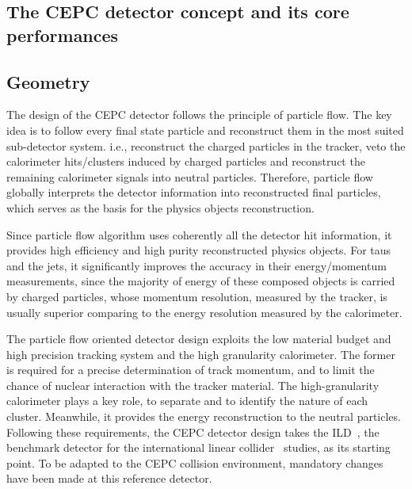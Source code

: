 \documentclass[a4paper,10pt,twoside]{cpc-hepnp}
\begin{document}
\begin{multicols}{2}
\section{The CEPC detector concept\label{sec:detector} and its core performances}

\subsection{Geometry}

The design of the CEPC detector follows the principle of particle flow. 
The key idea is to follow every final state particle and reconstruct them in the most suited sub-detector system. 
i.e., reconstruct the charged particles in the tracker, veto the calorimeter hits/clusters induced by charged particles and reconstruct the remaining calorimeter signals into neutral particles. 
Therefore, particle flow globally interprets the detector information into reconstructed final particles, which serves as the basis for the physics objects reconstruction. 

Since particle flow algorithm uses coherently all the detector hit information, it provides high efficiency and high purity reconstructed physics objects. 
For taus and the jets, it significantly improves the accuracy in their energy/momentum measurements, 
since the majority of energy of these composed objects is carried by charged particles, 
whose momentum resolution, measured by the tracker, is usually superior comparing to the energy resolution measured by the calorimeter. 

The particle flow oriented detector design exploits the low material budget and high precision tracking system and the high granularity calorimeter. 
The former is required for a precise determination of track momentum, and to limit the chance of nuclear interaction with the tracker material. 
The high-granularity calorimeter plays a key role, to separate and to identify the nature of each cluster. 
Meanwhile, it provides the energy reconstruction to the neutral particles. 
Following these requirements, the CEPC detector design takes the ILD~\cite{ref:ild}, the benchmark detector for the international linear collider~\cite{ref:ilc} studies, as its starting point.
To be adapted to the CEPC collision environment, mandatory changes have been made at this reference detector. 


\end{multicols}
\end{document}
